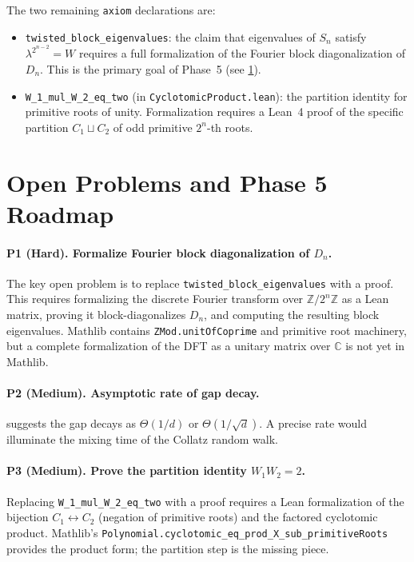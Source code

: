 \documentclass[12pt]{article}
\newcommand{\Z}{\mathbb{Z}}
\newcommand{\C}{\mathbb{C}}
\newcommand{\Zmod}[1]{\Z/2^{#1}\Z}
\begin{document}
The two remaining \texttt{axiom} declarations are:
\begin{itemize}
  \item \texttt{twisted\_block\_eigenvalues}: the claim that eigenvalues
    of $S_n$ satisfy $\lambda^{2^{n-2}} = W$ requires a full
    formalization of the Fourier block diagonalization of $D_n$.  This
    is the primary goal of Phase~5 (see \cref{sec:openproblems}).
  \item \texttt{W\_1\_mul\_W\_2\_eq\_two} (in \texttt{CyclotomicProduct.lean}):
    the partition identity for primitive roots of unity.  Formalization
    requires a Lean~4 proof of the specific partition $C_1 \sqcup C_2$
    of odd primitive $2^n$-th roots.
\end{itemize}

\section{Open Problems and Phase 5 Roadmap}
\label{sec:openproblems}

\paragraph{P1 (Hard). Formalize Fourier block diagonalization of $D_n$.}
The key open problem is to replace \texttt{twisted\_block\_eigenvalues}
with a proof.  This requires formalizing the discrete Fourier transform
over $\Zmod{n}$ as a Lean matrix, proving it block-diagonalizes $D_n$,
and computing the resulting block eigenvalues.  Mathlib contains
\texttt{ZMod.unitOfCoprime} and primitive root machinery, but a
complete formalization of the DFT as a unitary matrix over $\C$ is not
yet in Mathlib.

\paragraph{P2 (Medium). Asymptotic rate of gap decay.}
 suggests the gap decays as $\Theta(1/d)$ or
$\Theta(1/\sqrt{d})$.  A precise rate would illuminate the mixing time
of the Collatz random walk.

\paragraph{P3 (Medium). Prove the partition identity $W_1 W_2 = 2$.}
Replacing \texttt{W\_1\_mul\_W\_2\_eq\_two} with a proof requires a
Lean formalization of the bijection $C_1 \leftrightarrow C_2$
(negation of primitive roots) and the factored cyclotomic product.
Mathlib's \texttt{Polynomial.cyclotomic\_eq\_prod\_X\_sub\_primitiveRoots}
provides the product form; the partition step is the missing piece.
\end{document}
